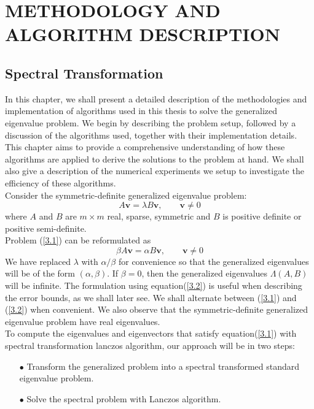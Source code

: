 \documentclass[12pt,gsu,online,openany,singleside,hidelinks]{gsudiss}
\begin{document}
\chapter{METHODOLOGY AND ALGORITHM DESCRIPTION}
\newtheorem{lemma}[theorem]{Lemma}
\section{Spectral Transformation}
In this chapter, we shall present a detailed description of the methodologies and implementation of algorithms used in this thesis to solve the generalized eigenvalue problem. We begin by describing the problem setup, followed by a discussion of the algorithms used, together with their implementation details. This chapter aims to provide a comprehensive understanding of how these algorithms are applied to derive the solutions to the problem at hand. We shall also give a description of the numerical experiments we setup to investigate the efficiency of these algorithms.\\
Consider the symmetric-definite generalized eigenvalue problem:
\begin{equation}\label{3.1}
	A\mathbf{v} = \lambda B\mathbf{v}, \qquad \mathbf{v} \neq 0
\end{equation}
where $A$ and $B$ are $m \times m$ real, sparse, symmetric and $B$ is positive definite or positive semi-definite.\\
Problem (\ref{3.1}) can be reformulated  as
\begin{equation}\label{3.2}
	\beta A\mathbf{v} = \alpha B\mathbf{v}, \qquad \mathbf{v} \neq 0
\end{equation}
We have replaced $\lambda$ with $\alpha/\beta$ for convenience so that the generalized eigenvalues will be of the form $(\alpha, \beta)$. If $ \beta = 0$, then the generalized eigenvalues $\Lambda(A, B)$ will be infinite. The formulation using equation(\ref{3.2}) is useful when describing the error bounds, as we shall later see. We shall alternate between (\ref{3.1}) and (\ref{3.2}) when convenient. We also observe that the symmetric-definite generalized eigenvalue problem have real eigenvalues.\\
To compute the eigenvalues and eigenvectors that satisfy equation(\ref{3.1}) with spectral transformation lanczos algorithm, our approach will be in two steps:
\begin{itemize}
	\item[$\bullet$] Transform the generalized problem into a spectral transformed standard eigenvalue problem.
	\item[$\bullet$] Solve the spectral problem with Lanczos algorithm.
\end{itemize}
\end{document}
